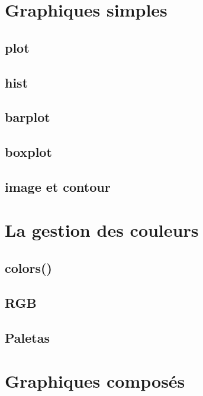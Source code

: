 \documentclass[]{book}
\theoremstyle{definition}
\theoremstyle{definition}
\theoremstyle{definition}
\theoremstyle{remark}
\begin{document}
\chapter{Graphiques simples}\label{graph1}

\section{plot}\label{plot}

\section{hist}\label{hist}

\section{barplot}\label{barplot}

\section{boxplot}\label{boxplot}

\section{image et contour}\label{image-et-contour}

\chapter{La gestion des couleurs}\label{graph2}

\section{colors()}\label{colors}

\section{RGB}\label{rgb}

\section{Paletas}\label{paletas}

\chapter{Graphiques composés}\label{graph3}
\end{document}
